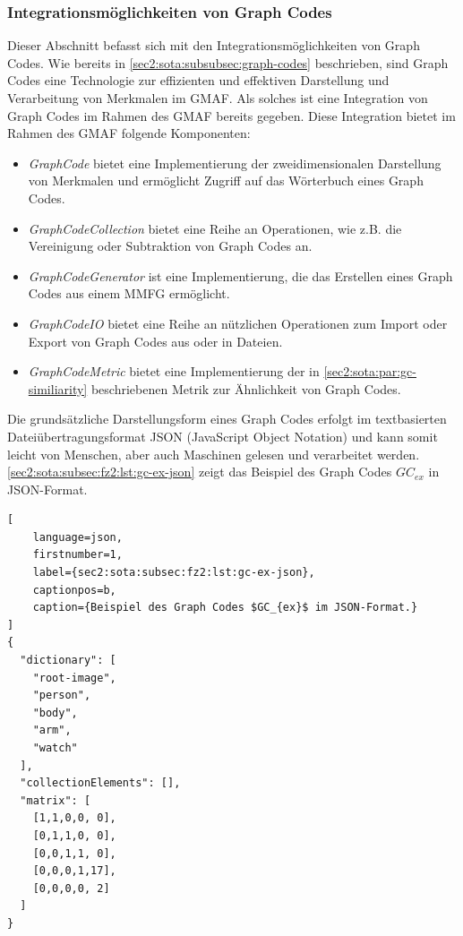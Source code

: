 \subsubsection{Integrationsmöglichkeiten von Graph Codes}
\label{sec2:sota:subsubsec:gc-capabilities-integration}
Dieser Abschnitt befasst sich mit den Integrationsmöglichkeiten von Graph Codes.
Wie bereits in \cref{sec2:sota:subsubsec:graph-codes} beschrieben, sind Graph Codes eine Technologie zur effizienten und effektiven Darstellung und Verarbeitung von Merkmalen im GMAF.
Als solches ist eine Integration von Graph Codes im Rahmen des GMAF bereits gegeben.
Diese Integration bietet im Rahmen des GMAF folgende Komponenten:
\begin{itemize}
    \item \textit{GraphCode} bietet eine Implementierung der zweidimensionalen Darstellung von Merkmalen und ermöglicht Zugriff auf das Wörterbuch eines Graph Codes.
    \item \textit{GraphCodeCollection} bietet eine Reihe an Operationen, wie z.B. die Vereinigung oder Subtraktion von Graph Codes an.
    \item \textit{GraphCodeGenerator} ist eine Implementierung, die das Erstellen eines Graph Codes aus einem MMFG ermöglicht.
    \item \textit{GraphCodeIO} bietet eine Reihe an nützlichen Operationen zum Import oder Export von Graph Codes aus oder in Dateien.
    \item \textit{GraphCodeMetric} bietet eine Implementierung der in \cref{sec2:sota:par:gc-similiarity} beschriebenen Metrik zur Ähnlichkeit von Graph Codes.
\end{itemize}

Die grundsätzliche Darstellungsform eines Graph Codes erfolgt im textbasierten Dateiübertragungsformat JSON (JavaScript Object Notation) und kann somit leicht von Menschen, aber auch Maschinen gelesen und verarbeitet werden.
\cref{sec2:sota:subsec:fz2:lst:gc-ex-json} zeigt das Beispiel des Graph Codes $GC_{ex}$ in JSON-Format.
\begin{lstlisting}[
    language=json,
    firstnumber=1,
    label={sec2:sota:subsec:fz2:lst:gc-ex-json},
    captionpos=b,
    caption={Beispiel des Graph Codes $GC_{ex}$ im JSON-Format.}
]
{
  "dictionary": [
    "root-image",
    "person",
    "body",
    "arm",
    "watch"
  ],
  "collectionElements": [],
  "matrix": [
    [1,1,0,0, 0],
    [0,1,1,0, 0],
    [0,0,1,1, 0],
    [0,0,0,1,17],
    [0,0,0,0, 2]
  ]
}
\end{lstlisting}

